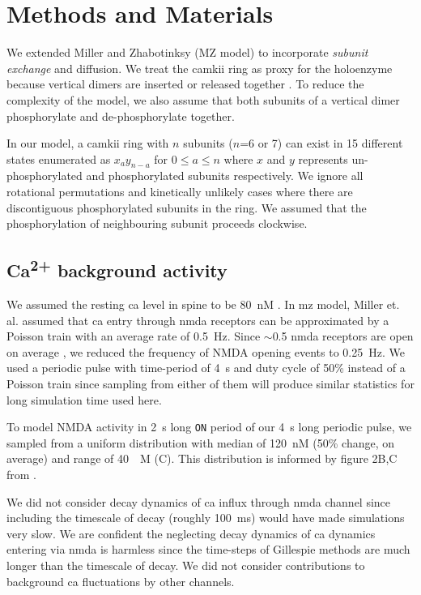\documentclass[9pt,lineno,doublespacing]{elife}
\newcommand\SUP[2]{#1\textsuperscript{#2}}
\begin{document}
\section{Methods and Materials}{\label{sec:materials_and_methods} 

We extended Miller and Zhabotinksy (MZ model) \citep{miller_stability_2005} to
incorporate \emph{subunit exchange} and diffusion. We treat the \gls{camkii}
ring as proxy for the holoenzyme because vertical dimers are inserted or
released together \citep{bhattacharyya_molecular_2016}. To reduce the complexity
of the model, we also assume that both subunits of a vertical dimer
phosphorylate and de-phosphorylate together. 

In our model, a \gls{camkii} ring with $n$ subunits ($n$=6 or 7) can exist
in 15 different states enumerated as $x_{a}y_{n-a}$ for $0 \le a \le n$ where
$x$ and $y$ represents un-phosphorylated and phosphorylated subunits
respectively. We ignore all rotational permutations and kinetically unlikely
cases where there are discontiguous phosphorylated subunits in the ring. We
assumed that the phosphorylation of neighbouring subunit proceeds clockwise.

\subsection{\SUP{Ca}{2+} background activity}\label{subsec:calcium_background}

We assumed the resting \gls{ca} level in spine to be \SI{80}{\nano M}
\citep{berridge_neuronal_1998}. In \gls{mz} model, Miller et. al. assumed that
\gls{ca} entry through \gls{nmda} receptors can be approximated by a Poisson
train with an average rate of \SI{0.5}{Hz}.  Since $\sim$0.5 \gls{nmda}
receptors are open on average \citep{nimchinsky_number_2004}, we reduced the
frequency of NMDA opening events to \SI{0.25}{Hz}. We used a periodic pulse with
time-period of \SI{4}{\second} and duty cycle of 50\% instead of a Poisson train
since sampling from either of them will produce similar statistics for long
simulation time used here. 

To model NMDA activity in \SI{2}{\second} long \texttt{ON} period of our
\SI{4}{\second} long periodic pulse, we sampled from a uniform distribution with
median of \SI{120}{\nano M} (50\% change, on average) and range of \SI{40}{\nano
M} (C). This distribution is informed by figure 2B,C from
\citep{nimchinsky_number_2004}.

We did not consider decay dynamics of \gls{ca} influx through \gls{nmda} channel
since including the timescale of decay (roughly \SI{100}{\milli\second}) would
have made simulations very slow. We are confident the neglecting decay dynamics
of \gls{ca} dynamics entering via \gls{nmda} is harmless since the time-steps of
Gillespie methods are much longer than the timescale of decay. We did not
consider contributions to background \gls{ca} fluctuations by other channels.

}
\end{document}
